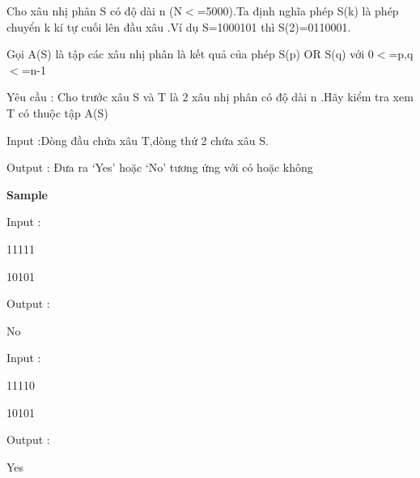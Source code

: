





   Cho xâu nhị phân S có độ dài n (N$<$=5000).Ta định nghĩa phép S(k) là phép chuyển k kí tự cuối lên đầu xâu .Ví dụ S=1000101 thì S(2)=0110001.  

   Gọi A(S) là tập các xâu nhị phân là kết quả của phép S(p) OR S(q) với 0$<$=p,q$<$=n-1  

   Yêu cầu : Cho trước xâu S và T là 2 xâu nhị phân có độ dài n .Hãy kiểm tra xem T có thuộc tập A(S)  

   Input :Dòng đầu chứa xâu T,dòng thứ 2 chứa xâu S.  

   Output : Đưa ra ‘Yes’ hoặc ‘No’ tương ứng với có hoặc không  

\textbf{     Sample    }

       Input :     

   11111  

   10101  

       Output :     

   No  



       Input :     

   11110  

   10101  

       Output :     

   Yes  



